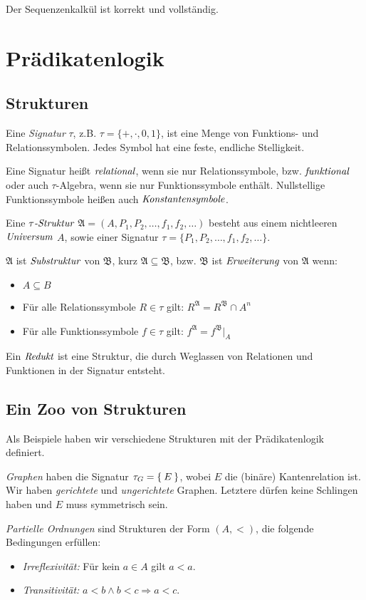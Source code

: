 \documentclass[a4paper,parskip=half*,DIV=15,fontsize=11pt]{scrartcl}
\newcommand{\A}{\mathfrak{A}}
\newcommand{\B}{\mathfrak{B}}
\begin{document}
Der Sequenzenkalkül ist korrekt und vollständig.

\section{Prädikatenlogik}
\subsection{Strukturen}
Eine \emph{Signatur} $\tau$, z.B. $\tau=\{+,\cdot,0,1\}$, ist eine Menge von Funktions- und Relationssymbolen. Jedes Symbol hat eine feste, endliche Stelligkeit.

Eine Signatur heißt $\emph{relational}$, wenn sie nur Relationssymbole, bzw. $\emph{funktional}$ oder auch $\tau$-Algebra, wenn sie nur Funktionssymbole enthält. Nullstellige Funktionssymbole heißen auch $\emph{Konstantensymbole}$.

Eine $\tau\emph{-Struktur}$ $\A=(A,P_1,P_2,\ldots,f_1,f_2,\ldots)$ besteht aus einem nichtleeren $\emph{Universum}$ $A$, sowie einer Signatur $\tau=\{P_1,P_2,\ldots,f_1,f_2,\ldots\}$.

$\A$ ist $\emph{Substruktur}$ von $\B$, kurz $\A \subseteq \B$, bzw. $\B$ ist $\emph{Erweiterung}$ von $\A$ wenn:
\begin{itemize}
    \item $A \subseteq B$
    \item Für alle Relationssymbole $R \in \tau$ gilt: $R^{\A}=R^{\B} \cap A^n$
    \item Für alle Funktionssymbole $f \in \tau$ gilt: $f^{\A}=f^{\B}|_A$
\end{itemize}

Ein $\emph{Redukt}$ ist eine Struktur, die durch Weglassen von Relationen und Funktionen in der Signatur entsteht.

\subsection{Ein Zoo von Strukturen}

Als Beispiele haben wir verschiedene Strukturen mit der Prädikatenlogik definiert.

\emph{Graphen} haben die Signatur $\tau_G = \Set{E}$, wobei $E$ die (binäre) Kantenrelation ist. Wir haben \emph{gerichtete} und \emph{ungerichtete} Graphen. Letztere dürfen keine Schlingen haben und $E$ muss symmetrisch sein.

\emph{Partielle Ordnungen} sind Strukturen der Form $(A,<)$, die folgende Bedingungen erfüllen:
\begin{itemize}
  \item \emph{Irreflexivität:} Für kein $a \in A$ gilt $a < a$.
  \item \emph{Transitivität:} $a < b \land b < c \Rightarrow a < c$.
\end{itemize}
\end{document}
